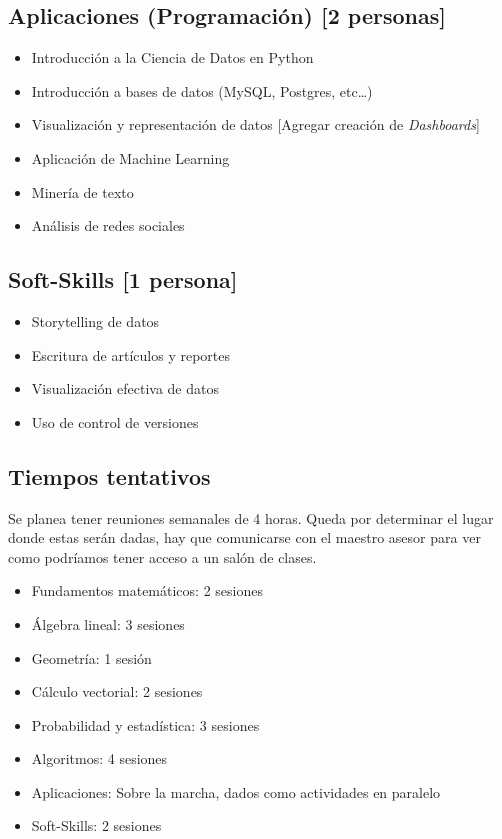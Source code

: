\documentclass{article}
\begin{document}
        \subsection{Aplicaciones (Programación) [2 personas]}
            
            \begin{itemize}
                \item Introducción a la Ciencia de Datos en Python
                \item Introducción a bases de datos (MySQL, Postgres, etc\dots)
                \item Visualización y representación de datos [Agregar creación de \emph{Dashboards}]
                \item Aplicación de Machine Learning
                \item Minería de texto
                \item Análisis de redes sociales
            \end{itemize}

        \subsection{Soft-Skills [1 persona]}

            \begin{itemize}
                \item Storytelling de datos
                \item Escritura de artículos y reportes
                \item Visualización efectiva de datos
                \item Uso de control de versiones
            \end{itemize}
            
        \subsection{Tiempos tentativos}
        
        Se planea tener reuniones semanales de 4 horas. Queda por determinar el lugar donde estas serán dadas, hay que comunicarse con el maestro asesor para ver como podríamos tener acceso a un salón de clases.

        \begin{itemize}
            \item Fundamentos matemáticos: 2 sesiones
            \item Álgebra lineal: 3 sesiones
            \item Geometría: 1 sesión
            \item Cálculo vectorial: 2 sesiones
            \item Probabilidad y estadística: 3 sesiones
            \item Algoritmos: 4 sesiones
            \item Aplicaciones: Sobre la marcha, dados como actividades en paralelo
            \item Soft-Skills: 2 sesiones
        \end{itemize}
\end{document}
